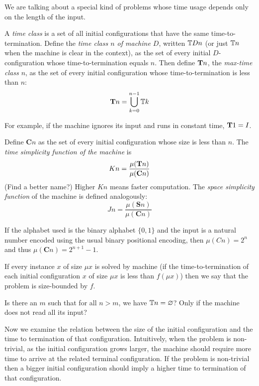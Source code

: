 We are talking about a special kind of problems
whose time usage depends only on the length of the input.

A \emph{time class} is a set of all initial configurations that have the same time-to-termination.
Define the \emph{time class $n$ of machine $D$},
written $\mathbb{T} D n$ (or just $\mathbb{T} n$ when the machine is clear in the context),
as the set of every initial $D$-configuration
whose time-to-termination equals $n$.
Then define $\mathbf{T} n$, the \emph{max-time class $n$},
as the set of every initial configuration whose time-to-termination is less than $n$:
\begin{equation}
    \mathbf{T} n = \bigcup_{k = 0}^{n - 1} \mathbb{T} k
\end{equation}

For example, if the machine ignores its input and runs in constant time,
$\mathbf{T} 1 = I$.

\newcommand{\Cset}{\mathbf{C}}
Define $\Cset n$ as the set of every initial configuration whose size is less than $n$.
The \emph{time simplicity function of the machine} is
\begin{equation}
    K n = \frac{\mu(\Teqsum n)}{\mu(\Cset n)}
\end{equation}
(Find a better name?)
Higher $K n$ means faster computation.
The \emph{space simplicity function} of the machine is defined analogously:
\begin{equation}
    J n = \frac{\mu(\mathbf S n)}{\mu(\Cset n)}
\end{equation}

If the alphabet used is the binary alphabet $\{ 0, 1 \}$
and the input is a natural number encoded using the usual binary positional encoding,
then $\mu (C n) = 2^n$ and thus $\mu (\Cset n) = 2^{n + 1} - 1$.

If every instance $x$ of size $\mu x$ is solved by machine
(if the time-to-termination of each initial configuration $x$ of size $\mu x$ is less than $f(\mu x)$)
then we say that the problem is size-bounded by $f$.

Is there an $m$ such that for all $n > m$, we have $\mathbb{T} n = \varnothing$?
Only if the machine does not read all its input?

Now we examine the relation between the size of the initial configuration
and the time to termination of that configuration.
Intuitively, when the problem is non-trivial, as the initial configuration grows larger,
the machine should require more time to arrive at the related terminal configuration.
If the problem is non-trivial then a bigger initial configuration
should imply a higher time to termination of that configuration.

